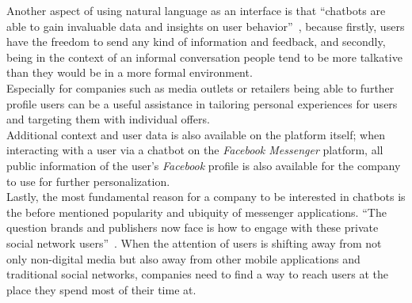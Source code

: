 Another aspect of using natural language as an interface is that ``chatbots are able to gain invaluable data and insights on user behavior''~\cite{drum},
because firstly, users have the freedom to send any kind of information and feedback, and
secondly, being in the context of an informal conversation people tend to be more talkative than they would be in a more formal environment.
\\
Especially for companies such as media outlets or retailers being able to further profile users can be a useful assistance in tailoring personal experiences for users and targeting them with individual offers.
\\
Additional context and user data is also available on the platform itself;
when interacting with a user via a chatbot on the \emph{Facebook Messenger} platform, all public information of the user's \emph{Facebook} profile is also available for the company to use for further personalization.
\\

Lastly, the most fundamental reason for a company to be interested in chatbots is the before mentioned popularity and ubiquity of messenger applications.
``The question brands and publishers now face is how to engage with these private social network users''~\cite{drum}.
When the attention of users is shifting away from not only non-digital media but also away from other mobile applications
and traditional social networks, companies need to find a way to reach users at the place they spend most of their time at.
